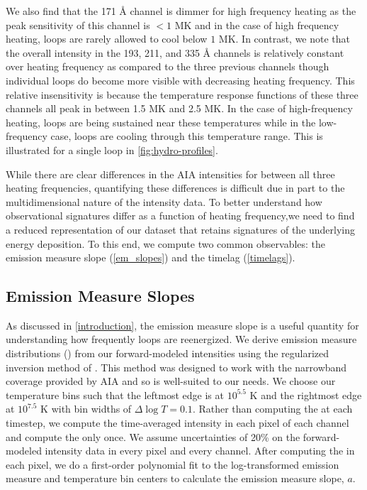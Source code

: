 We also find that the 171 \AA{} channel is dimmer for high frequency heating as the peak sensitivity of this channel is $<1$ MK and in the case of high frequency heating, loops are rarely allowed to cool below $1$ MK. In contrast, we note that the overall intensity in the 193, 211, and 335 \AA{} channels is relatively constant over heating frequency as compared to the three previous channels though individual loops do become more visible with decreasing heating frequency. This relative insensitivity is because the temperature response functions of these three channels all peak in between 1.5 MK and 2.5 MK. In the case of high-frequency heating, loops are being sustained near these temperatures while in the low-frequency case, loops are cooling through this temperature range. This is illustrated for a single loop in \autoref{fig:hydro-profiles}.

While there are clear differences in the AIA intensities for between all three heating frequencies, quantifying these differences is difficult due in part to the multidimensional nature of the intensity data. To better understand how observational signatures differ as a function of heating frequency,we need to find a reduced representation of our dataset that retains signatures of the underlying energy deposition. To this end, we compute two common observables: the emission measure slope (\autoref{em_slopes}) and the timelag (\autoref{timelags}).

\subsection{Emission Measure Slopes}\label{em_slopes}

As discussed in \autoref{introduction}, the emission measure slope is a useful quantity for understanding how frequently loops are reenergized. We derive emission measure distributions (\dem{}) from our forward-modeled intensities using the regularized inversion method of \citet{hannah_differential_2012}. This method was designed to work with the narrowband coverage provided by AIA and so is well-suited to our needs. We choose our temperature bins such that the leftmost edge is at $10^{5.5}$ K and the rightmost edge at $10^{7.5}$ K with bin widths of $\Delta\log T=0.1$. Rather than computing the \dem{} at each timestep, we compute the time-averaged intensity in each pixel of each channel and compute the \dem{} only once. We assume uncertainties of 20\% on the forward-modeled intensity data in every pixel and every channel. After computing the \dem{} in each pixel, we do a first-order polynomial fit to the log-transformed emission measure and temperature bin centers to calculate the emission measure slope, $a$.

